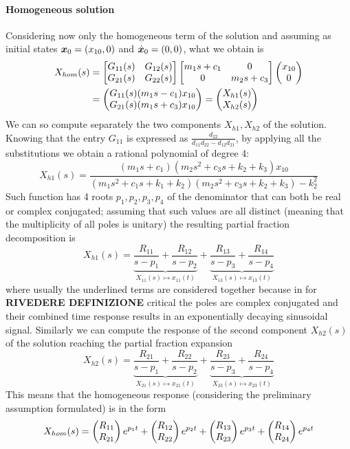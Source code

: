 	\paragraph{Homogeneous solution} Considering now only the homogeneous term of the solution and assuming as initial states $\vett x_0 = (x_{10},0)$ and $\dvett x_0 =(0,0)$, what we obtain is
	\begin{align*}
		X_{hom}(s) & = \matrix{ G_{11}(s) & G_{12}(s) \\ G_{21}(s) & G_{22}(s) }  \matrix{ m_1 s + c_1 & 0 \\ 0 & m_2 s + c_3 } \vec{x_{10} \\ 0} \\ & = \vec{G_{11}(s) (m_1 s- c_1) x_{10} \\ G_{21}(s) (m_1s + c_3) x_{10} } = \vec{X_{h1}(s) \\ X_{h2}(s) }
	\end{align*}
	We can so compute separately the two components $X_{h1},X_{h2}$ of the solution. Knowing that the entry $G_{11}$ is expressed as $\frac{d_{22}}{d_{11}d_{22} - d_{12}d_{21}}$, by applying all the substitutions we obtain a rational polynomial of degree 4:
	\[ X_{h1}(s) = \frac{(m_1s + c_1) (m_2 s^2 + c_3 s + k_2 + k_3) x_{10}}{ (m_1 s^2 + c_1 s + k_1 + k_2)(m_2s^2 + c_3s + k_2+k_3) - k_2^2 } \]
	Such function has 4 roots $p_1,p_2,p_3,p_4$ of the denominator that can both be real or complex conjugated; assuming that such values are all distinct (meaning that the multiplicity of all poles is unitary) the resulting partial fraction decomposition is
	\[ X_{h1}(s) = \underbrace{\frac{R_{11}}{s-p_1} + \frac{R_{12}}{s-p_2}}_{X_{11}(s) \mapsto x_{11}(t) } + \underbrace{\frac{R_{13}}{s-p_3} + \frac{R_{14}}{s-p_4}}_{X_{13}(s)\mapsto x_{13}(t)} \]
	where usually the underlined terms are considered together because in for \textbf{RIVEDERE DEFINIZIONE} critical the poles are complex conjugated and their combined time response results in an exponentially decaying sinusoidal signal. Similarly we can compute the response of the second component $X_{h2}(s)$ of the solution reaching the partial fraction expansion
	\[ X_{h2}(s) = \underbrace{\frac{R_{21}}{s-p_1} + \frac{R_{22}}{s-p_2}}_{X_{21}(s) \mapsto x_{21}(t) } + \underbrace{\frac{R_{23}}{s-p_3} + \frac{R_{24}}{s-p_4}}_{X_{23}(s)\mapsto x_{23}(t)} \]
	This means that the homogeneous response (considering the preliminary assumption formulated) is in the form
	\[ X_{hom}(s) = \vec{R_{11} \\ R_{21} } e^{p_1 t} + \vec{R_{12} \\ R_{22} } e^{p_2 t} + \vec{R_{13} \\ R_{23} } e^{p_3 t} + \vec{R_{14} \\ R_{24} } e^{p_4 t} \]
	
